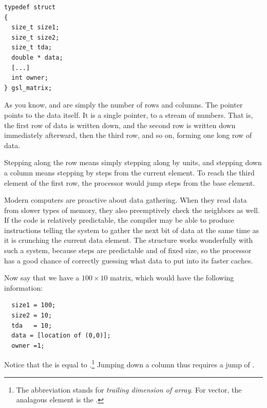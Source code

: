 \begin{lstlisting}
typedef struct
{
  size_t size1;
  size_t size2;
  size_t tda;
  double * data;
  [...]
  int owner;
} gsl_matrix;
\end{lstlisting}

As you know,  and  are simply the number of rows and columns. The
 pointer points to the data itself. It is a single pointer, to
a stream of numbers. That is, the first row of data is written down, and
the second row is written down immediately afterward, then the third
row, and so on, forming one long row of data.

Stepping along the row means simply stepping along by 
units, and stepping down a column means stepping by  steps from the current element.  To reach the third element of
the first row, the processor would jump  steps from
the base element.

Modern computers are proactive about data gathering. When they read data
from slower types of memory, they also preemptively check the neighbors
as well. If the code is relatively predictable, the compiler may be
able to produce instructions telling the system to gather the next bit
of data at the same time as it is crunching the current data element.
The  structure works wonderfully with such a system,
because steps are predictable and of fixed size, so the processor
has a good chance of correctly guessing what data to put into its
faster caches.

Now say that we have a $100 \times 10$ matrix, which would have the following information:
\begin{lstlisting}
  size1 = 100;
  size2 = 10;
  tda   = 10;
  data = [location of (0,0)];
  owner =1;
\end{lstlisting}
Notice that the    is equal to
.\footnote{The abbreviation  stands for {\em
trailing dimension of array}. For vector, the analagous element is
the .} Jumping down a column thus requires a jump of
.

